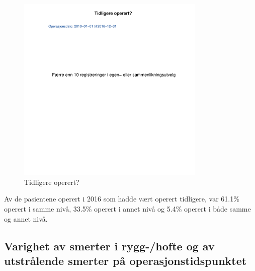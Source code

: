 \documentclass [norsk,a4paper,twoside]{article}\usepackage[]{graphicx}\usepackage[]{color}
\begin{document}
\begin{figure}[ht]
\centering \includegraphics[width= 0.8\textwidth]{TidlOp.pdf}
\caption{\label{fig:TidlOp} Tidligere operert? }
\end{figure}



Av de pasientene operert i 2016 som hadde vært operert tidligere, var 61.1\% 
operert i samme nivå, 33.5\% 
operert i annet nivå og 5.4\% 
operert i både samme og annet nivå. 



\subsection{Varighet av smerter i rygg-/hofte og av utstrålende smerter på operasjonstidspunktet}
\end{document}
